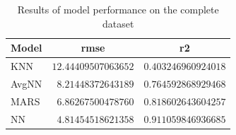 \documentclass[letterpaper,12pt,titlepage,oneside,final]{report}
\begin{document}
                \begin{table}[!hp]
                    \begin{center}
                    \begin{tabular}{lrr}
                    \hline\hline
                    \multicolumn{1}{l}{Model}&\multicolumn{1}{c}{rmse}&\multicolumn{1}{c}{r2}\tabularnewline
                    \hline
                    KNN&$12.44409507063652$&$0.403246960924018$\tabularnewline
                    AvgNN&$ 8.21448372643189$&$0.764592868929468$\tabularnewline
                    MARS&$ 6.86267500478760$&$0.818602643604257$\tabularnewline
                    NN&$ 4.81454518621358$&$0.911059846936685$\tabularnewline
                    \hline
                    \end{tabular}
                    \caption{Results of model performance on the complete dataset}
                    \label{test-res}
                    \end{center}
                \end{table}
                \clearpage
\end{document}

